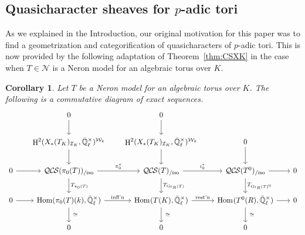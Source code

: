 \documentclass[10pt]{amsart}
\theoremstyle{plain}
\newtheorem{corollary}[theorem]{Corollary}
\theoremstyle{definition}
\newcommand{\EE}{\mathbb{\bar Q}_\ell}
\newcommand{\Fq}{k}
\newcommand{\EEx}{\EE^\times}
\newcommand{\Weil}[1]{\mathcal{W}_{#1}}
\DeclareMathOperator{\Hom}{Hom}
\DeclareMathOperator{\Gr}{Gr}
\DeclareMathOperator{\Hh}{H}
\newcommand{\iso}{{\ \cong\ }}
\newcommand{\TrFrob}[1]{T_{#1}}
\newcommand{\QCS}{{\mathcal{QC\hskip-0.8pt S}}}
\newcommand{\QCSiso}[1]{\QCS(#1)_{/\text{iso}}}
\begin{document}
\subsection{Quasicharacter sheaves for $p$-adic tori} \label{ssec:CS_tori}

As we explained in the Introduction, our original motivation for this paper was to find a geometrization and categorification of quasicharacters of $p$-adic tori. 
This is now provided by the following adaptation of Theorem~\ref{thm:CSXK} in the case when $T\in \mathcal{N}$ is a Neron model for an algebraic torus over $K$.

\begin{corollary}\label{cor:CS_tori}
Let $T$ be a Neron model for an algebraic torus over $K$.
The following is a commutative diagram of exact sequences.
\[
  \begin{tikzcd}[row sep=20, column sep=18]
{}  & 0 \arrow{d} & 0 \arrow{d} &  & \\ 
   & \Hh^2(X_*(T_K)_{\mathcal{I}_K},\EEx)^{\Weil{\Fq}}  \arrow{d} & \arrow{d} \Hh^2(X_*(T_K)_{\mathcal{I}_K},\EEx)^{\Weil{\Fq}} & 0 \arrow{d} & \\
    0 \rar & \QCSiso{\pi_0(T)} \arrow{r}{\pi_0^*} \dar{\TrFrob{\pi_0(T)}}
    & \QCSiso{T} \arrow{r}{\iota_0^*}  \arrow{d}{\TrFrob{\Gr_R(T)}} & \QCSiso{T^0} \arrow{r} \arrow{d}{\TrFrob{\Gr_R(T)^0}} & 0\\
    0 \arrow{r} & \Hom(\pi_0(T)(\Fq), \EEx) \arrow{r}{\text{infl'n}} \arrow{d}{\iso}
    & \arrow{d}{\iso} \Hom_\text{}(T(K),\EEx) \arrow{r}{\text{rest'n}} & \Hom_\text{}(T^0(R),\EEx) \arrow{r} \arrow{d}{\iso} & 0\\
 &  0  & 0 & 0 & 
  \end{tikzcd}
 \]
 \end{corollary}
\end{document}
